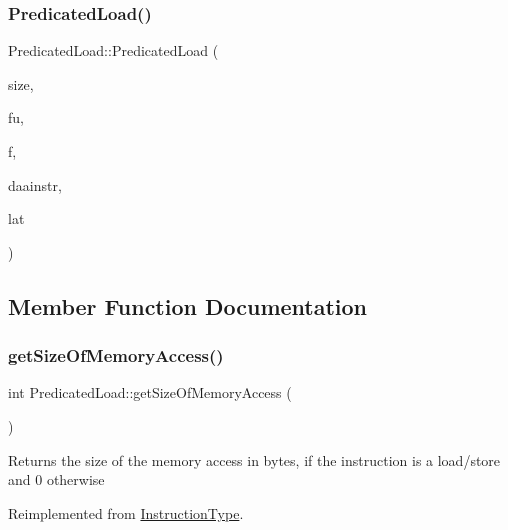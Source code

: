 \subsubsection{\texorpdfstring{Predicated\+Load()}{PredicatedLoad()}}
{\footnotesize\ttfamily Predicated\+Load\+::\+Predicated\+Load (\begin{DoxyParamCaption}\item[{int}]{size,  }\item[{const string \&}]{fu,  }\item[{const set$<$ \hyperlink{classInstructionFormat}{Instruction\+Format} $\ast$$>$ \&}]{f,  }\item[{\hyperlink{classDAAInstruction}{D\+A\+A\+Instruction} $\ast$}]{daainstr,  }\item[{int}]{lat }\end{DoxyParamCaption})}



\subsection{Member Function Documentation}
\mbox{\label{classPredicatedLoad_a0f4d0a0830281e9f87c733eb253a1a5e}} 
\subsubsection{\texorpdfstring{get\+Size\+Of\+Memory\+Access()}{getSizeOfMemoryAccess()}}
{\footnotesize\ttfamily int Predicated\+Load\+::get\+Size\+Of\+Memory\+Access (\begin{DoxyParamCaption}{ }\end{DoxyParamCaption})\hspace{0.3cm}{\ttfamily [virtual]}}

Returns the size of the memory access in bytes, if the instruction is a load/store and 0 otherwise 

Reimplemented from \hyperlink{classInstructionType_a40c94ccf0b13f186524e06972f08bca3}{Instruction\+Type}.

\mbox{\label{classPredicatedLoad_a6eba0b6ea212b012d2015fb023804fc3}} 
